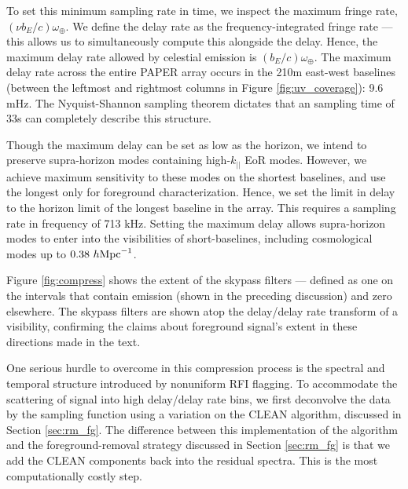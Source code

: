To set this minimum sampling rate in time, we inspect the maximum fringe rate, $ (\nu
b_E/c)\omega_\oplus$. We define the delay rate as the frequency-integrated fringe rate --- this
allows us to simultaneously compute this alongside the delay. Hence, the maximum delay rate allowed
by celestial emission is $(b_E/c)\omega_\oplus$. The maximum delay rate across the entire PAPER
array occurs in the 210m east-west baselines (between the leftmost and rightmost columns in Figure
\ref{fig:uv_coverage}): 9.6 mHz. The Nyquist-Shannon sampling theorem dictates that an sampling time of
33s can completely describe this structure.

Though the maximum delay can be set as low as the horizon, we intend to preserve supra-horizon modes
containing high-$k_{||}$ EoR modes. However, we achieve maximum sensitivity to these modes on the
shortest baselines, and use the longest only for foreground characterization. Hence, we set the
limit in delay to the horizon limit of the longest baseline in the array. This requires a sampling
rate in frequency of 713 kHz. Setting the maximum delay allows supra-horizon modes to enter into the
visibilities of short-baselines, including cosmological modes up to $0.38\ h{\rm Mpc}^{-1}$.

Figure \ref{fig:compress} shows the extent of the skypass filters --- defined as one on the
intervals that contain emission (shown in the preceding discussion) and zero elsewhere. The skypass
filters are shown atop the delay/delay rate transform of a visibility, confirming the claims about
foreground signal's extent in these directions made in the text.

One serious hurdle to overcome in this compression process is the spectral and temporal structure
introduced by nonuniform RFI flagging. To accommodate the scattering of signal into high delay/delay
rate bins, we first deconvolve the data by the sampling function using a variation on the CLEAN
algorithm, discussed in Section \ref{sec:rm_fg}. The difference between this implementation of the
algorithm and the foreground-removal strategy discussed in Section \ref{sec:rm_fg} is that we add
the CLEAN components back into the residual spectra. This is the most computationally costly step.

